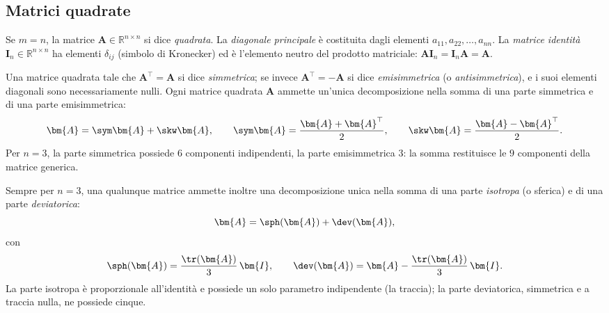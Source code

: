 \subsection{Matrici quadrate}\label{par:matrici_quadrate}

Se $m=n$, la matrice $\bm{A} \in \mathbb{R}^{n \times n}$ si dice \textit{quadrata}.
La \textit{diagonale principale} \`e costituita dagli elementi $a_{11}, a_{22},
\ldots, a_{nn}$. La \textit{matrice identit\`a} $\bm{I}_n \in \mathbb{R}^{n\times n}$
ha elementi $\delta_{ij}$ (simbolo di Kronecker) ed \`e l'elemento neutro del
prodotto matriciale: $\bm{A}\bm{I}_n = \bm{I}_n\bm{A} = \bm{A}$.


Una matrice	quadrata tale che $\bm{A}^\top = \bm{A}$ si dice \textit{simmetrica};
se invece $\bm{A}^\top = -\bm{A}$ si dice \textit{emisimmetrica}
(o \textit{antisimmetrica}), e i suoi elementi diagonali sono necessariamente nulli.	
Ogni matrice quadrata $\bm{A}$ ammette un'unica decomposizione nella somma
di una parte simmetrica e di una parte emisimmetrica:
\begin{equation}
	\bm{A} = \sym\bm{A} + \skw\bm{A},
	\qquad
	\sym\bm{A} = \dfrac{\bm{A}+\bm{A}^\top}{2},
	\qquad
	\skw\bm{A} = \dfrac{\bm{A}-\bm{A}^\top}{2}.
\end{equation}
Per $n = 3$, la parte simmetrica possiede $6$ componenti
indipendenti, la parte emisimmetrica $3$: la somma restituisce
le $9$ componenti della matrice generica. 

Sempre per $n=3$, una qualunque matrice ammette inoltre una decomposizione
unica nella somma di una parte \textit{isotropa} (o sferica)
e di una parte \textit{deviatorica}:
\begin{equation}
\bm{A} = \sph(\bm{A}) + \dev(\bm{A}),
\end{equation}
con
\begin{equation}
	\sph(\bm{A})
	= \frac{\tr(\bm{A})}{3}\,\bm{I},
	\qquad
	\dev(\bm{A})
	= \bm{A}
	- \frac{\tr(\bm{A})}{3}\,\bm{I}.
\end{equation}
La parte isotropa è proporzionale all'identità e possiede un
solo parametro indipendente (la traccia); la parte deviatorica,
simmetrica e a traccia nulla, ne possiede cinque. 

